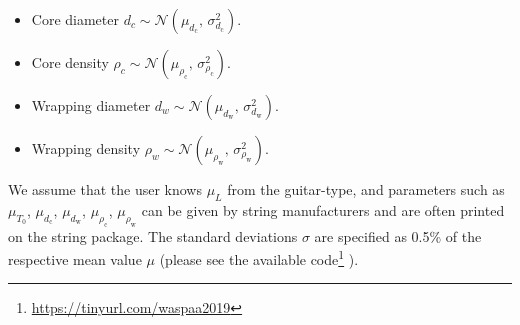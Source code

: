 \documentclass{article}
\begin{document}
\begin{sloppy}
\begin{itemize}
    \item Core diameter $ d_c \sim \mathcal{N}(\mu_{d_\text{c}},\,\sigma_{d_\text{c}}^{2})$.
    \item Core density $ \rho_c \sim \mathcal{N}(\mu_{\rho_\text{c}},\,\sigma_{\rho_\text{c}}^{2})$.
    \item Wrapping diameter $ d_w \sim \mathcal{N}(\mu_{d_\text{w}},\,\sigma_{d_\text{w}}^{2})$.
    \item Wrapping density $\rho_w \sim \mathcal{N}(\mu_{\rho_\text{w}},\,\sigma_{\rho_\text{w}}^{2})$.

\end{itemize}
%
We assume that the user knows $\mu_L$ from the guitar-type, and parameters such as $\mu_{T_0}$, $\mu_{d_\text{c}}$, $\mu_{d_\text{w}}$, $\mu_{\rho_\text{c}}$, $\mu_{\rho_\text{w}}$ can be given by string manufacturers and are often printed on the string package. The standard deviations $\sigma$ are specified as 0.5\% of the respective mean value $\mu$ (please see the available code\footnote{\url{https://tinyurl.com/waspaa2019}} ).
%
%
%
%
%
%




\end{sloppy}
\end{document}
